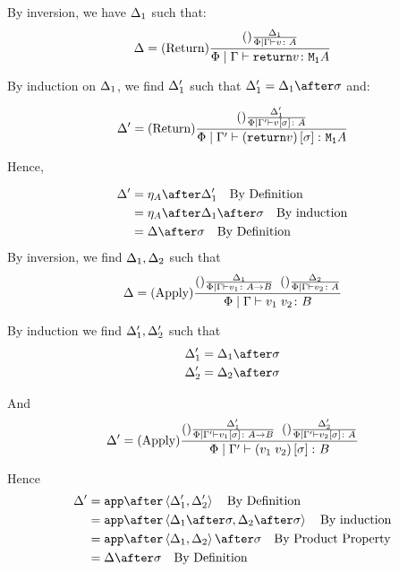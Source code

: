 \documentclass{report}
\begin{document}

By inversion, we have $\Delta_1$ such that:
\begin{equation}
    \Delta = (\text{Return}) \frac{(\text{}) \frac{\Delta_1}{\Phi\mid\Gamma \vdash v \colon A}}{\Phi\mid\Gamma \vdash \texttt{return} v \colon \texttt{M}_{\texttt{1}}{A}}
\end{equation}

By induction on $\Delta_1$, we find $\Delta_1'$ such that $\D_1' = \D_1\after\si$ and:

\begin{equation}
    \Delta' = (\text{Return}) \frac{(\text{}) \frac{\Delta_1'}{\Phi\mid\Gamma' \vdash v\left[\sigma\right] \colon A}}{\Phi\mid\Gamma' \vdash (\texttt{return} v)\left[\sigma\right] \colon \texttt{M}_{\texttt{1}}{A}}
\end{equation}

Hence,

\begin{align}
    \D' & = \point{A}\after\D_1'\qt{By Definition}\\
    & = \point{A}\after\D_1\after\si\qt{By induction}\\
    & = \D\after\si\qt{By Definition}\\
\end{align}
By inversion, we find $\Delta_1, \Delta_2$ such that
\begin{equation}
    \Delta = (\text{Apply}) \frac{(\text{}) \frac{\Delta_1}{\Phi\mid\Gamma \vdash v_1 \colon A\rightarrow B}\;\;(\text{}) \frac{\Delta_2}{\Phi\mid\Gamma \vdash v_2 \colon A}}{\Phi\mid\Gamma \vdash v_1\; v_2 \colon B}
\end{equation}

By induction we find $\Delta_1', \Delta_2'$ such that 
\begin{align}
    \D_1' &= \D_1\after\si\\
    \D_2' &= \D_2\after\si\\
\end{align}

And
\begin{equation}
    \Delta' = (\text{Apply}) \frac{(\text{}) \frac{\Delta_1'}{\Phi\mid\Gamma' \vdash v_1\left[\sigma\right] \colon A\rightarrow B}\;\;(\text{}) \frac{\Delta_2'}{\Phi\mid\Gamma' \vdash v_2\left[\sigma\right] \colon A}}{\Phi\mid\Gamma' \vdash (v_1\; v_2)\left[\sigma\right] \colon B}
\end{equation}

Hence
\begin{align}
    \D' &= \app\after\pr{\D_1'}{\D_2'}\qt{By Definition}\\
        &= \app\after\pr{\D_1\after\si}{\D_2\after\si}\qt{By induction}\\
        &= \app\after\pr{\D_1}{\D_2}\after\si\qt{By Product Property}\\
        & = \D\after\si\qt{By Definition}\\
\end{align}
\end{document}
